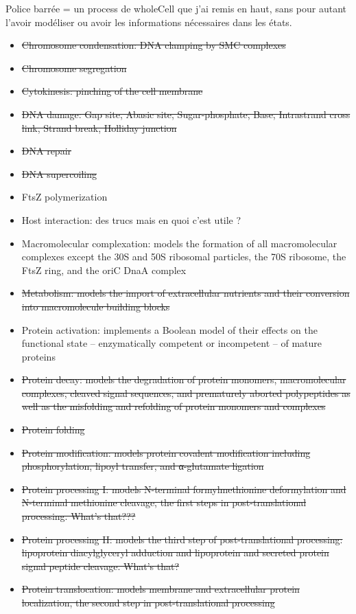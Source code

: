 Police barr\'{e}e = un process de wholeCell que j'ai remis en haut, sans pour autant l'avoir mod\'{e}liser ou avoir les informations n\'{e}cessaires dans les \'{e}tats.
\begin{itemize}
  \item \sout{Chromosome condensation: DNA clamping by SMC complexes}
  \item \sout{Chromosome segregation}
  \item \sout{Cytokinesis: pinching of the cell membrane}
  \item \sout{DNA damage: Gap site, Abasic site, Sugar-phosphate, Base, Intrastrand cross link, Strand break, Holliday junction}
  \item \sout{DNA repair}
  \item \sout{DNA supercoiling}
  \item FtsZ polymerization
  \item Host interaction: des trucs mais en quoi c'est utile ?
  \item Macromolecular complexation: models the formation of all macromolecular complexes except the 30S and 50S ribosomal particles, the 70S ribosome, the FtsZ ring, and the oriC DnaA complex
  \item \sout{Metabolism: models the import of extracellular nutrients and their conversion into macromolecule building blocks}
  \item Protein activation:  implements a Boolean model of their effects on the functional state – enzymatically competent or incompetent – of mature proteins
  \item \sout{Protein decay: models the degradation of protein monomers, macromolecular complexes, cleaved signal sequences, and prematurely aborted polypeptides as well as the misfolding and refolding of protein monomers and complexes}
  \item \sout{Protein folding}
  \item \sout{Protein modification: models protein covalent modification including phosphorylation, lipoyl transfer, and α-glutamate ligation}
  \item \sout{Protein processing I: models N-terminal formylmethionine deformylation and N-terminal methionine cleavage, the first steps in post-translational processing. What's that???}
  \item \sout{Protein processing II: models the third step of post-translational processing: lipoprotein diacylglyceryl adduction and lipoprotein and secreted protein signal peptide cleavage. What's that?}
  \item \sout{Protein translocation: models membrane and extracellular protein localization, the second step in post-translational processing}

\end{itemize}
